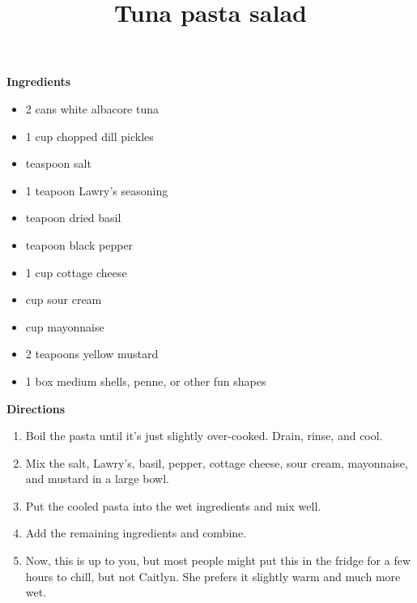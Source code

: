 \documentclass{article}
\title{Tuna pasta salad}
\begin{document}
\textbf{Ingredients}

\begin{itemize}
      \item 2 cans white albacore tuna
      \item 1 cup chopped dill pickles
      \item {} teaspoon salt
      \item 1 teapoon Lawry's seasoning
      \item {} teapoon dried basil
      \item {} teapoon black pepper
      \item 1 cup cottage cheese
      \item {} cup sour cream
      \item {} cup mayonnaise
      \item 2 teapoons yellow mustard
      \item 1 box medium shells, penne, or other fun shapes
\end{itemize}

\textbf{Directions}

\begin{enumerate}
      \item Boil the pasta until it's just slightly over-cooked. Drain, rinse, and cool.
      \item Mix the salt, Lawry's, basil, pepper, cottage cheese, sour cream, mayonnaise, and mustard in
            a large bowl.
      \item Put the cooled pasta into the wet ingredients and mix well.
      \item Add the remaining ingredients and combine.
      \item Now, this is up to you, but most people might put this in the fridge for a few hours to chill,
            but not Caitlyn. She prefers it slightly warm and much more wet.
\end{enumerate}


\end{document}
